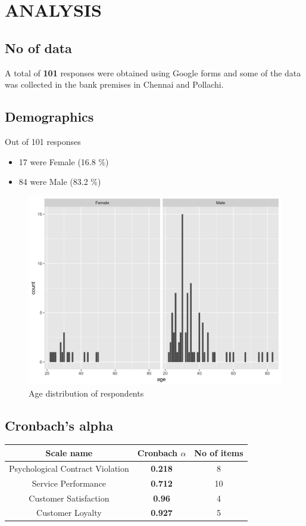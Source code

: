 \documentclass[a4paper, 14pt]{article}
\begin{document}
{\section*{ANALYSIS}
\subsection*{No of data}
\par A total of \textbf{101} responses were obtained using Google forms and some of the data was collected in the bank premises in Chennai and Pollachi.
\subsection*{Demographics}
\par Out of 101 responses
\begin{itemize}
\item 17 were Female (16.8 \%)
\item 84 were Male (83.2 \%)
\end{itemize}
\begin{figure}[H]
\centering
\includegraphics[scale=0.2]{age_distribution.png}
\caption{Age distribution of respondents}
\end{figure}
\subsection*{Cronbach's alpha}
\begin{center}
\begin{tabular}{|c|c|c|}
\hline
\textbf{Scale name} & \textbf{Cronbach $\alpha$} & \textbf{No of items}\\
\hline
Psychological Contract Violation & \textbf{0.218} & 8\\
Service Performance & \textbf{0.712} & 10\\
Customer Satisfaction & \textbf{0.96} & 4\\
Customer Loyalty & \textbf{0.927} & 5 \\
\hline
\end{tabular}
\end{center}

}
\end{document}
